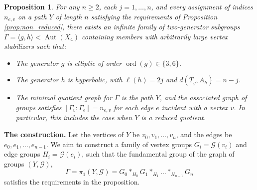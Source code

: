\documentclass[12pt,leqno]{amsart}
\newcommand{\2}{L^2_{\rm per}(0, T)}
\newtheorem{prop}{Proposition}[section]
\newcommand{\aut}{{\operatorname{Aut}}}
\newcommand{\ord}{{\operatorname{ord}}}
\numberwithin{equation}{section}
\numberwithin{figure}{section}
\begin{document}
\begin{prop}\label{thm:path}
    For any $n\geq 2$, each $j=1,\dots, n$, and every assignment of indices $n_{e,v}$ on a path $Y$ of length $n$ satisfying the requirements of Proposition \ref{prop:non_reduced}, there exists an infinite family of two-generator subgroups $\Gamma = \langle g,h\rangle< \aut(X_4)$ containing members with arbitrarily large vertex stabilizers such that:
    \begin{itemize}
        \item The generator $g$ is elliptic of order $\ord(g) \in \{3, 6\}$.
        \item The generator $h$ is hyperbolic, with $\ell(h) = 2j$ and $d(T_g,A_h) = n-j$.
        \item The minimal quotient graph for $\Gamma$ is the path $Y$, and the associated graph of groups satisfies $[\Gamma_v : \Gamma_e] = n_{e,v}$ for each edge $e$ incident with a vertex $v$. In particular, this includes the case when $Y$ is a reduced quotient.
    \end{itemize}
\end{prop}
\textbf{The construction.} Let the vertices of $Y$ be $v_0,v_1,\dots, v_n$, and the edges be $e_0,e_1,\dots, e_{n-1}$. We aim to construct a family of vertex groups $G_i = \mathcal{G}(v_i)$ and edge groups $H_i = \mathcal{G}(e_i)$, such that the fundamental group of the graph of groups $(Y,\mathcal{G})$,
\[
    \Gamma = \pi_1(Y,\mathcal{G}) = G_0 *_{H_0} G_1 *_{H_1}\dots *_{H_{n-1}} G_n
\]
satisfies the requirements in the proposition.
\end{document}
